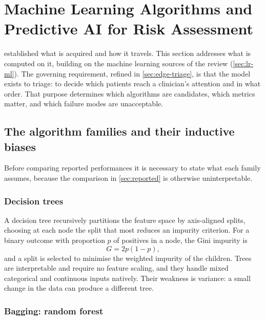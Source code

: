 \documentclass[12pt,a4paper,oneside]{report}
\begin{document}
\section{Machine Learning Algorithms and Predictive AI for Risk Assessment}\label{sec:ml}

 established what is acquired and how it travels. This section addresses what is computed on it, building on the machine learning sources of the review (\cref{sec:lr-ml}). The governing requirement, refined in \cref{sec:edge-triage}, is that the model exists to triage: to decide which patients reach a clinician's attention and in what order. That purpose determines which algorithms are candidates, which metrics matter, and which failure modes are unacceptable.


\subsection{The algorithm families and their inductive biases}\label{sec:families}

Before comparing reported performances it is necessary to state what each family assumes, because the comparison in \cref{sec:reported} is otherwise uninterpretable.

\subsubsection{Decision trees}

A decision tree recursively partitions the feature space by axis-aligned splits, choosing at each node the split that most reduces an impurity criterion. For a binary outcome with proportion $p$ of positives in a node, the Gini impurity is
\begin{equation}
  G = 2p(1-p),
\end{equation}
and a split is selected to minimise the weighted impurity of the children. Trees are interpretable and require no feature scaling, and they handle mixed categorical and continuous inputs natively. Their weakness is variance: a small change in the data can produce a different tree.

\subsubsection{Bagging: random forest}
\end{document}
